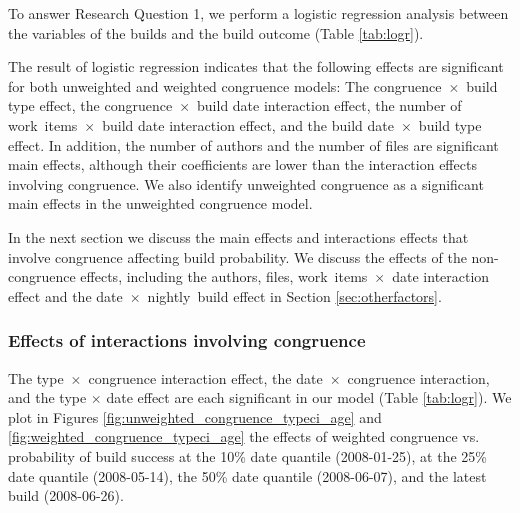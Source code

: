 To answer Research Question 1, we perform a logistic regression analysis between the variables of the builds and the build outcome (Table \ref{tab:logr}).

The result of logistic regression indicates that the following effects are significant for both unweighted and weighted congruence models: The congruence~$\times$~build type effect, the congruence~$\times$~build date interaction effect, the number of work~items~$\times$~build date interaction effect, and the build date~$\times$~build type effect. In addition, the number of authors and the number of files are significant main effects, although their coefficients are lower than the interaction effects involving congruence. We also identify unweighted congruence as a significant main effects in the unweighted congruence model.

In the next section we discuss the main effects and interactions effects that involve congruence affecting build probability. We discuss the effects of the non-congruence effects, including the authors, files, work~items~$\times$~date interaction effect and the date~$\times$~nightly~build effect in Section \ref{sec:otherfactors}.

\subsubsection{Effects of interactions involving congruence}
\label{sec:congruenceinteractions}
The type~$\times$~congruence interaction effect, the date~$\times$~congruence interaction, and the type $\times$ date effect are each significant in our model (Table \ref{tab:logr}). We plot in Figures \ref{fig:unweighted_congruence_typeci_age} and \ref{fig:weighted_congruence_typeci_age} the effects of weighted congruence vs. probability of build success at the 10\% date quantile (2008-01-25), at the 25\% date quantile (2008-05-14), the 50\% date quantile (2008-06-07), and the latest build (2008-06-26).


